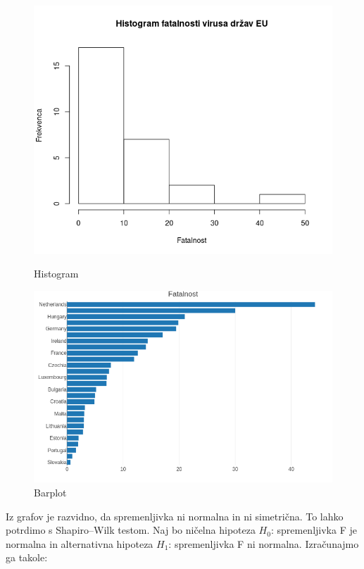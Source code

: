 \documentclass[a4paper,11pt]{article}
\begin{document}
\begin{figure}[!htb]
   \begin{minipage}{0.5\textwidth}
     \centering
     \includegraphics[width=1\linewidth]{histogram_fatalnost}
     \caption{Histogram}\label{Fig:Data1}
   \end{minipage}\hfill
   \begin{minipage}{0.5\textwidth}
     \centering
     \includegraphics[width=1\linewidth]{barplot_fatalnost}
     \caption{Barplot}\label{Fig:Data2}
   \end{minipage}
\end{figure}
Iz grafov je razvidno, da spremenljivka ni normalna in ni simetrična. To lahko potrdimo s Shapiro–Wilk testom. Naj bo ničelna hipoteza \(H_0\): spremenljivka F je normalna in alternativna hipoteza \(H_1\): spremenljivka F ni normalna. Izračunajmo ga takole:
\end{document}
